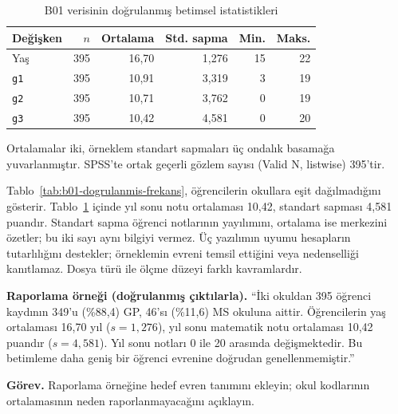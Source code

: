 \begin{table}[htbp]
\centering
\caption{B01 verisinin doğrulanmış betimsel istatistikleri}
\label{tab:b01-dogrulanmis-betimsel}
\small
\begin{tabular}{@{}lrrrrr@{}}
\toprule
Değişken & $n$ & Ortalama & Std. sapma & Min. & Maks. \\
\midrule
Yaş & 395 & 16,70 & 1,276 & 15 & 22 \\
\texttt{g1} & 395 & 10,91 & 3,319 & 3 & 19 \\
\texttt{g2} & 395 & 10,71 & 3,762 & 0 & 19 \\
\texttt{g3} & 395 & 10,42 & 4,581 & 0 & 20 \\
\bottomrule
\end{tabular}
\par\smallskip
{\footnotesize Ortalamalar iki, örneklem standart sapmaları üç ondalık
basamağa yuvarlanmıştır. SPSS'te ortak geçerli gözlem sayısı
(Valid N, listwise) 395'tir.\par}
\end{table}

\begin{outputguidebox}
Tablo~\ref{tab:b01-dogrulanmis-frekans}, öğrencilerin okullara eşit
dağılmadığını gösterir. Tablo~\ref{tab:b01-dogrulanmis-betimsel} içinde yıl
sonu notu ortalaması 10,42, standart sapması 4,581 puandır. Standart sapma
öğrenci notlarının yayılımını, ortalama ise merkezini özetler; bu iki
sayı aynı bilgiyi vermez. Üç yazılımın uyumu hesapların tutarlılığını
destekler; örneklemin evreni temsil ettiğini veya nedenselliği kanıtlamaz.
Dosya türü ile ölçme düzeyi farklı kavramlardır.
\end{outputguidebox}

\textbf{Raporlama örneği (doğrulanmış çıktılarla).}
``İki okuldan 395 öğrenci kaydının 349'u (\%88,4) GP, 46'sı (\%11,6)
MS okuluna aittir. Öğrencilerin yaş ortalaması 16,70 yıl
($s=1{,}276$), yıl sonu matematik notu ortalaması 10,42 puandır
($s=4{,}581$). Yıl sonu notları 0 ile 20 arasında değişmektedir.
Bu betimleme daha geniş bir öğrenci evrenine doğrudan genellenmemiştir.''


\textbf{Görev.} Raporlama örneğine hedef evren tanımını ekleyin; okul kodlarının ortalamasının neden raporlanmayacağını açıklayın.